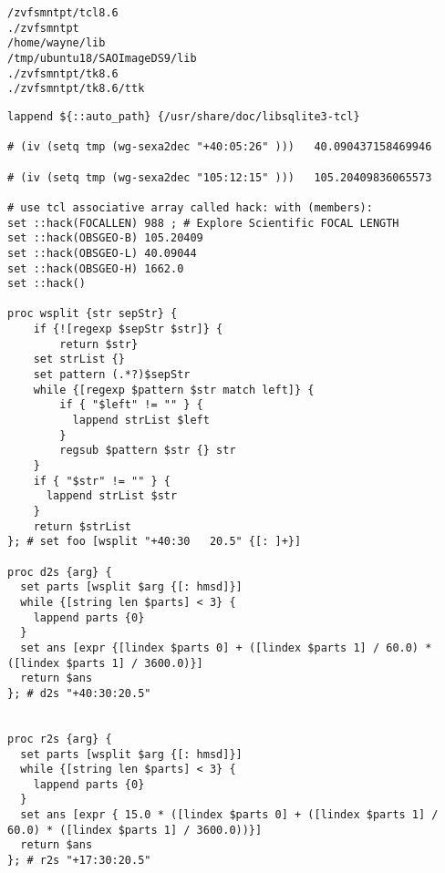 \begingroup \fontsize{10pt}{10pt}
\selectfont
\begin{verbatim} 
/zvfsmntpt/tcl8.6
./zvfsmntpt
/home/wayne/lib
/tmp/ubuntu18/SAOImageDS9/lib
./zvfsmntpt/tk8.6
./zvfsmntpt/tk8.6/ttk
\end{verbatim}
\endgroup

\begingroup \fontsize{10pt}{10pt}
\selectfont
\begin{verbatim} 
lappend ${::auto_path} {/usr/share/doc/libsqlite3-tcl}

# (iv (setq tmp (wg-sexa2dec "+40:05:26" )))   40.090437158469946

# (iv (setq tmp (wg-sexa2dec "105:12:15" )))   105.20409836065573

# use tcl associative array called hack: with (members):
set ::hack(FOCALLEN) 988 ; # Explore Scientific FOCAL LENGTH
set ::hack(OBSGEO-B) 105.20409
set ::hack(OBSGEO-L) 40.09044
set ::hack(OBSGEO-H) 1662.0
set ::hack()

proc wsplit {str sepStr} {
    if {![regexp $sepStr $str]} {
        return $str}
    set strList {}
    set pattern (.*?)$sepStr
    while {[regexp $pattern $str match left]} {
        if { "$left" != "" } {
          lappend strList $left
        }
        regsub $pattern $str {} str
    }
    if { "$str" != "" } {
      lappend strList $str
    }
    return $strList
}; # set foo [wsplit "+40:30   20.5" {[: ]+}]

proc d2s {arg} {
  set parts [wsplit $arg {[: hmsd]}]
  while {[string len $parts] < 3} {
    lappend parts {0}
  }
  set ans [expr {[lindex $parts 0] + ([lindex $parts 1] / 60.0) * ([lindex $parts 1] / 3600.0)}]
  return $ans
}; # d2s "+40:30:20.5"


proc r2s {arg} {
  set parts [wsplit $arg {[: hmsd]}]
  while {[string len $parts] < 3} {
    lappend parts {0}
  }
  set ans [expr { 15.0 * ([lindex $parts 0] + ([lindex $parts 1] / 60.0) * ([lindex $parts 1] / 3600.0))}]
  return $ans
}; # r2s "+17:30:20.5"


\end{verbatim}
\endgroup


%
